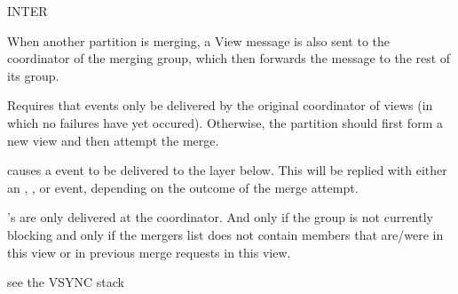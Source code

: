 \begin{Layer}{INTER}
\begin{Properties}
\item
When another partition is merging, a View message is also sent to the
coordinator of the merging group, which then forwards the message to
the rest of its group.
\item 
Requires that  events only be delivered by the original
coordinator of views (in which no failures have yet occured).
Otherwise, the partition should first form a new view and then attempt
the merge.
\item
{} causes a  event to be delivered to the layer below.  This
will be replied with either an , , or 
event, depending on the outcome of the merge attempt.
\item
{}'s are only delivered at the coordinator.  And only if the
group is not currently blocking and only if the mergers list does not
contain members that are/were in this view or in previous merge requests in
this view.
\end{Properties}

\begin{Sources}
\end{Sources}

\begin{GenEvent}
\end{GenEvent}

\begin{Testing}
\item
see the VSYNC stack
\end{Testing}
\end{Layer}

